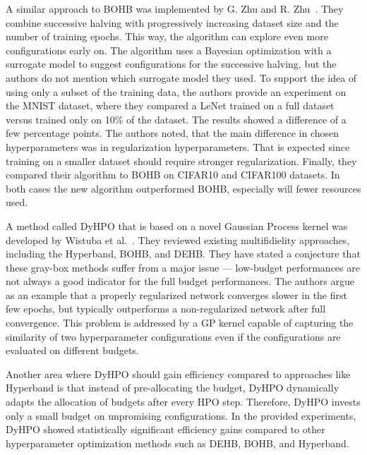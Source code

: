 A similar approach to BOHB was implemented by G. Zhu and R. Zhu~\cite{zhu2020accelerating}. They combine successive halving with progressively increasing dataset size and the number of training epochs. This way, the algorithm can explore even more configurations early on. The algorithm uses a Bayesian optimization with a surrogate model to suggest configurations for the successive halving, but the authors do not mention which surrogate model they used. To support the idea of using only a subset of the training data, the authors provide an experiment on the MNIST dataset, where they compared a LeNet trained on a full dataset versus trained only on 10\% of the dataset. The results showed a difference of a few percentage points. The authors noted, that the main difference in chosen hyperparameters was in regularization hyperparameters. That is expected since training on a smaller dataset should require stronger regularization. Finally, they compared their algorithm to BOHB on CIFAR10 and CIFAR100 datasets. In both cases the new algorithm outperformed BOHB, especially will fewer resources used.



A method called DyHPO that is based on a novel Gaussian Process kernel was developed by Wistuba et al.~\cite{wistuba2022supervising}. They reviewed existing multifidielity approaches, including the Hyperband, BOHB, and DEHB. They have stated a conjecture that these gray-box methods suffer from a major issue --- low-budget performances are not always a good indicator for the full budget performances. The authors argue as an example that a properly regularized network converges slower in the first few epochs, but typically outperforms a non-regularized network after full convergence. This problem is addressed by a GP kernel capable of capturing the similarity of two hyperparameter configurations even if the configurations are evaluated on different budgets.

Another area where DyHPO should gain efficiency compared to approaches like Hyperband is that instead of pre-allocating the budget, DyHPO dynamically adapts the allocation of budgets after every HPO step. Therefore, DyHPO invests only a small budget on unpromising configurations. In the provided experiments, DyHPO showed statistically significant efficiency gains compared to other hyperparameter optimization methods such as DEHB, BOHB, and Hyperband.



